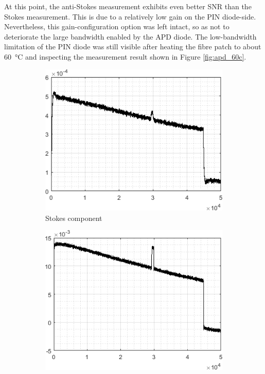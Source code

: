 \documentclass{standalone}
\begin{document}
At this point, the anti-Stokes measurement exhibits even better SNR than the Stokes measurement. This is due to a relatively low gain on the PIN diode-side. Nevertheless, this gain-configuration option was left intact, so as not to deteriorate the large bandwidth enabled by the APD diode. The low-bandwidth limitation of the PIN diode was still visible after heating the fibre patch to about \SI{60}{\celsius} and inspecting the measurement result shown in Figure \ref{fig:apd_60c}.
\begin{figure}[h!]
	\begin{subfigure}[b]{0.49\textwidth}
		\includegraphics[width=\textwidth]{apd_60c_stokes.png}
		\caption{Stokes component}
		\vspace{1em}
	\end{subfigure}
	\begin{subfigure}[b]{0.49\textwidth}
		\includegraphics[width=\textwidth]{apd_60c_antistokes.png}

\end{subfigure}
\end{figure}
\end{document}
